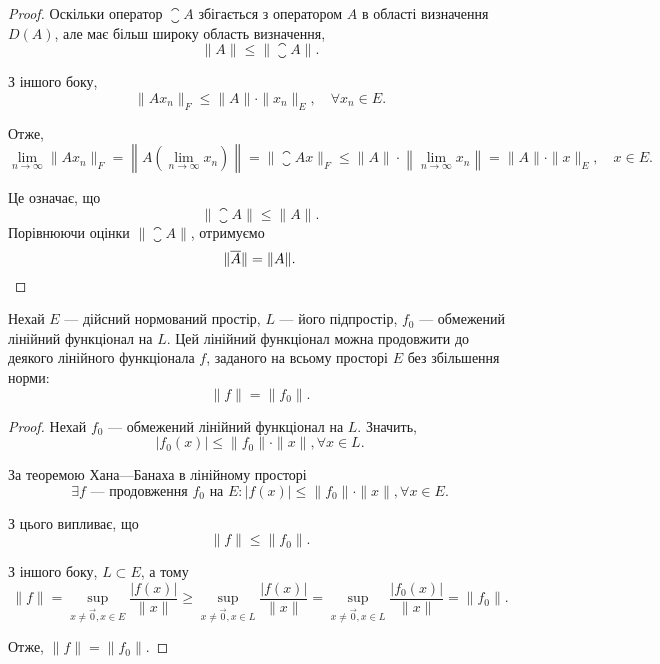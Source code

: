 \begin{proof}
Оскільки оператор $\closure A$ збігається з оператором $A$ в області
визначення $D(A)$, але має більш широку область визначення,
\begin{equation*}
    \|A\| \le \|\closure A\|.
\end{equation*}

З іншого боку,
\begin{equation*}
    \|Ax_n\|_F \le \|A\| \cdot \|x_n\|_E, \quad \forall x_n \in E.
\end{equation*}

Отже,
\begin{equation*}
    \lim_{n \to \infty} \|Ax_n\|_F =
    \left\| A \left( \lim_{n \to \infty} x_n \right) \right\| =
    \| \closure A x \|_F \le 
    \|A\| \cdot \left\| \lim_{n \to \infty} x_n \right\| = 
    \|A\| \cdot \|x\|_E, \quad x \in E.
\end{equation*}

Це означає, що
\begin{equation*}
    \|\closure A\| \le \|A\|.
\end{equation*}
Порівнюючи оцінки $\|\closure A\|$, отримуємо
\begin{equation*}
    \|\overline{A}\| = \|A\|. \qedhere
\end{equation*}
\end{proof}

\begin{theorem} Нехай
$E$ --- дійсний нормований простір, $L$ --- його підпростір,
$f_0$ --- обмежений лінійний функціонал на $L$. Цей лінійний
функціонал можна продовжити до деякого лінійного
функціонала $f$, заданого на всьому просторі $E$ без
збільшення норми:
\begin{equation*}
    \|f\| = \|f_0\|.
\end{equation*}
\end{theorem}

\begin{proof}
Нехай $f_0$ --- обмежений лінійний функціонал на $L$. Значить,
\begin{equation*}
    |f_0(x)| \le \|f_0\| \cdot \|x\|, \forall x \in L.
\end{equation*}

За теоремою Хана---Банаха в лінійному просторі
\begin{equation*}
    \exists f \text{ --- продовження } f_0 \text{ на } E:
    |f(x)| \le \|f_0\| \cdot \|x\|, \forall x \in E.
\end{equation*}

З цього випливає, що
\begin{equation*}
    \|f\| \le \|f_0\|.
\end{equation*}

З іншого боку, $L \subset E$, а тому
\begin{equation*}
    \|f\| = \sup_{x \ne \vec 0, x \in E} \frac{|f(x)|}{\|x\|} \ge
    \sup_{x \ne \vec 0, x \in L} \frac{|f(x)|}{\|x\|} =
    \sup_{x \ne \vec 0, x \in L} \frac{|f_0(x)|}{\|x\|} = \|f_0\|.
\end{equation*}

Отже, $\|f\| = \|f_0\|$.
\end{proof}

